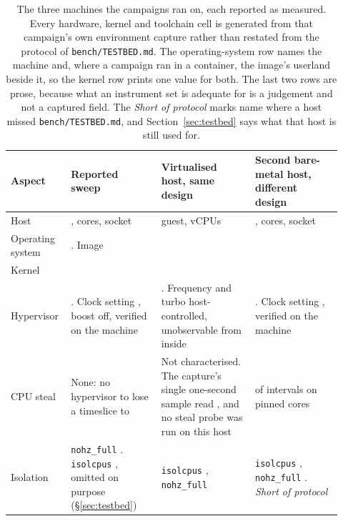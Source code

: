 \documentclass[english,oneside,a4paper,censored,csm,software-track-2020]{HYthesisML}
\begin{document}
\begin{appendices}
\clearpage
\enlargethispage{160pt}
\begin{table}[!ht]
\centering
\small
\caption[The three measurement hosts]{The three machines the campaigns ran on, each reported as
measured. Every hardware, kernel and toolchain cell is generated from that campaign's own
environment capture rather than restated from the protocol of \texttt{bench/TESTBED.md}. The
operating-system row names the machine and, where a campaign ran in a container, the image's
userland beside it, so the kernel row prints one value for both. The last
two rows are prose, because what an instrument set is adequate for is a judgement and not a captured
field. The \emph{Short of protocol} marks name where a host missed \texttt{bench/TESTBED.md},
and Section~\ref{sec:testbed} says what that host is still used for.\label{tab:testbed}}
\renewcommand{\arraystretch}{1.0}
\scriptsize
\begin{tabular}{@{}R{0.14\linewidth} R{0.26\linewidth} R{0.27\linewidth} R{0.25\linewidth}@{}}
\hline\hline
Aspect & Reported sweep & Virtualised host, same design & Second bare-metal host, different design \\
\hline
Host & \MainCpu{}, \MainCores{} cores, \MainSockets{} socket & \GuestCpu{} guest, \GuestCores{} vCPUs & \BmCpu{}, \BmCores{} cores, \BmSockets{} socket \\
Operating system & \MainHostDistro{}. Image \MainDistro{} & \GuestDistro{} & \BmDistro{} \\
Kernel & \MainKernel{} & \GuestKernel{} & \BmKernel{} \\
Hypervisor & \MainVirt{}. Clock setting \MainGovernor{}, boost off, verified on the machine & \GuestVirt{}. Frequency and turbo host-controlled, unobservable from inside & \BmVirt{}. Clock setting \BmGovernor{}, verified on the machine \\
CPU steal & None: no hypervisor to lose a timeslice to & Not characterised. The capture's single one-second sample read \GuestSteal{}, and no steal probe was run on this host & \BmStealWithSteal{} of \BmStealIntervals{} intervals on \BmStealCores{} pinned cores \\
Isolation & \texttt{nohz\_full} \MainNohzFull{}. \texttt{isolcpus} \MainIsolcpus{}, omitted on purpose (\S\ref{sec:testbed}) & \texttt{isolcpus} \GuestIsolcpus{}, \texttt{nohz\_full} \GuestNohzFull{} & \texttt{isolcpus} \BmIsolcpus{}, \texttt{nohz\_full} \BmNohzFull{}. \emph{Short of protocol} \\

\end{tabular}
\end{table}
\end{appendices}
\end{document}
